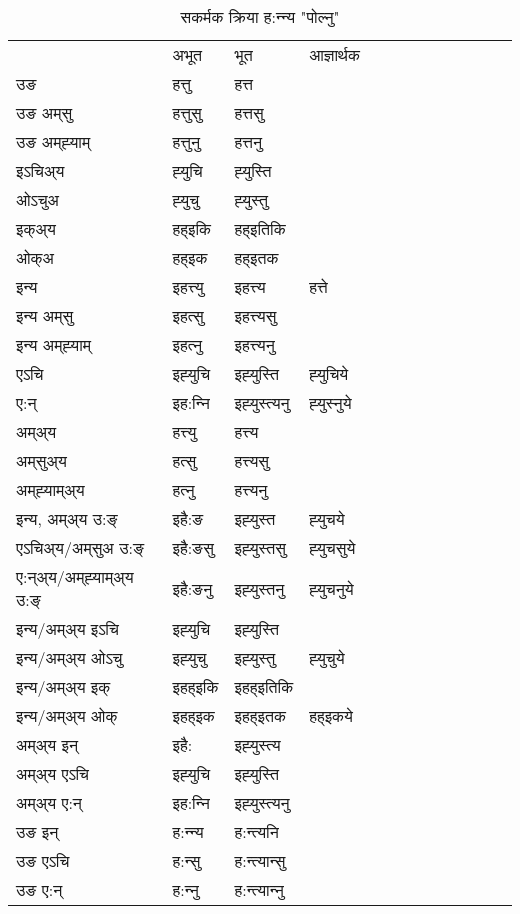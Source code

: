 \begin{table}[H]
\centering
\caption{\label{utt.vt} सकर्मक क्रिया  ह:न्‍न्य  "पोल्नु"  }
\begin{tabular}{l|l|l|l|l|l|l|l|l|l|l|l|l}  \toprule
&अभूत & भूत & आज्ञार्थक \\ 
उङ &हत्तु &हत्त \\ 
उङ अम्‌सु&हत्तुसु &हत्तसु \\ 
उङ अम्‌ह्‍याम्&हत्तुनु &हत्तनु \\ 
इऽचिअ्य &ह्‍युचि &ह्‍युस्ति   \\ 
ओऽचुअ        &ह्‍युचु &ह्‍युस्तु   \\ 
इक्अ्य&हह्इकि &हह्इतिकि   \\ 
ओक्अ &हह्इक &हह्इतक   \\ 
इन्य & इहत्त्यु  & इहत्त्य &हत्ते  \\ 
इन्य अम्‌सु& इहत्सु  & इहत्त्यसु   \\ 
इन्य अम्‌ह्‍याम्& इहत्‍नु  & इहत्त्यनु   \\ 
एऽचि & इह्‍युचि & इह्‍युस्ति &ह्‍युचिये    \\ 
ए:न् & इह:न्‍नि  & इह्‍युस्त्यनु &ह्‍युस्‍नुये  \\ 
अम्अ्य & हत्त्यु  & हत्त्य  \\ 
अम्‌सुअ्य & हत्सु & हत्त्यसु  \\ 
अम्‌ह्‍याम्अ्य & हत्‍नु  & हत्त्यनु \\ 
\midrule
इन्य, अम्अ्य उ:ङ्‌ &इहै:ङ &इह्‍युस्त &ह्‍युचये \\ 
एऽचिअ्य/अम्‌सुअ उ:ङ्‌ &इहै:ङसु &इह्‍युस्तसु &ह्‍युचसुये \\ 
ए:न्अ्य/अम्‌ह्‍याम्अ्य उ:ङ्‌ &इहै:ङनु &इह्‍युस्तनु &ह्‍युचनुये \\ 
इन्य/अम्अ्य इऽचि &इह्‍युचि &इह्‍युस्ति    \\ 
इन्य/अम्अ्य ओऽचु &इह्‍युचु &इह्‍युस्तु  &ह्‍युचुये  \\ 
इन्य/अम्अ्य इक् &इहह्इकि &इहह्इतिकि   \\ 
इन्य/अम्अ्य ओक् &इहह्इक &इहह्इतक  &हह्इकये  \\ 
अम्अ्य इन् & इहै: & इह्‍युस्त्य   \\ 
अम्अ्य एऽचि & इह्‍युचि & इह्‍युस्ति    \\ 
अम्अ्य ए:न् & इह:न्‍नि  & इह्‍युस्त्यनु  \\ 
\midrule
उङ इन् & ह:न्‍न्य  & ह:न्त्यनि  \\ 
उङ एऽचि & ह:न्सु  & ह:न्त्यान्सु   \\ 
उङ ए:न्& ह:न्‍नु  & ह:न्त्यान्‍नु   \\ 
\bottomrule
\end{tabular}
\end{table}


